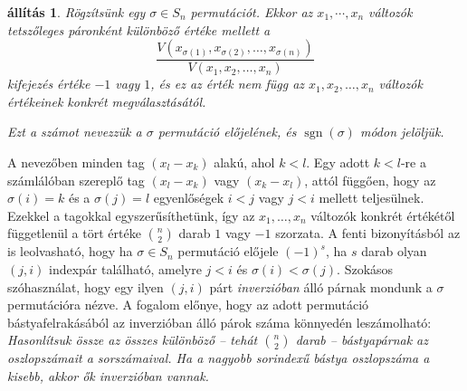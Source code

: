 \documentclass[a4paper, showtrims]{memoir}
\makeatletter
\renewenvironment{proof}[1][\proofname]
    {\par\pushQED{\qed}%
    \normalfont \topsep6\p@\@plus6\p@\relax
    \trivlist
    \item[\hskip\labelsep
        \itshape
    #1\@addpunct{:}]\ignorespaces}
    {\popQED\endtrivlist\@endpefalse}
\theoremstyle{plain}
\newtheorem{proposition}{állítás}[chapter]
\theoremstyle{remark}
\theoremstyle{definition}
\DeclareMathOperator{\sgn}{sgn}
\makeatother
\begin{document}
\begin{proposition}
    Rögzítsünk egy $\sigma\in S_n$ permutációt. 
    Ekkor az $x_1,\cdots,x_n$ változók tetszőleges páronként különböző értéke mellett a
    \[
        \frac{V\left( x_{\sigma(1)},x_{\sigma(2)},\ldots,x_{\sigma(n)} \right)}{V(x_1,x_2,\ldots,x_n)}
    \]
    kifejezés értéke $-1$ vagy $1$, és ez az érték nem függ az 
    $x_1,x_2,\ldots,x_n$ változók értékeinek konkrét megválasztásától.

    Ezt a számot nevezzük a $\sigma$ permutáció \emph{előjelének}, és $\sgn(\sigma)$ módon jelöljük.
\end{proposition}
    \begin{proof}
        A nevezőben minden tag $\left( x_l-x_k \right)$ alakú, ahol $k<l$. 
        Egy adott $k<l$-re
        a számlálóban szereplő tag $\left( x_l-x_k \right)$ vagy $\left( x_k-x_l \right)$, 
        attól függően, hogy az $\sigma(i)=k$ és a $\sigma(j)=l$ 
        egyenlőségek $i<j$ vagy $j<i$ mellett teljesülnek.
        Ezekkel a tagokkal egyszerűsíthetünk, 
        így az $x_1,\dots,x_n$ változók konkrét értékétől függetlenül a tört értéke $n\choose 2$ darab $1$ vagy $-1$ szorzata.
    \end{proof}
    A fenti bizonyításból az is leolvasható, 
    hogy ha $\sigma\in S_n$ permutáció előjele $\left( -1 \right)^s$,
    ha $s$ darab olyan $\left( j,i \right)$ indexpár található,
    amelyre $j<i$ és $\sigma(i)<\sigma(j)$.
    Szokásos szóhasználat, 
    hogy egy ilyen $\left( j,i \right)$ párt \emph{inverzióban} álló párnak mondunk a $\sigma$ permutációra nézve.
    A fogalom előnye, hogy az adott permutáció bástyafelrakásából az inverzióban álló párok száma könnyedén leszámolható:
\emph{
	Hasonlítsuk össze az összes különböző -- tehát $\binom{n}{2}$ darab --
	bástyapárnak az oszlopszámait a sorszámaival.
	Ha a nagyobb sorindexű bástya oszlopszáma a kisebb, akkor ők inverzióban vannak.
}
\end{document}
